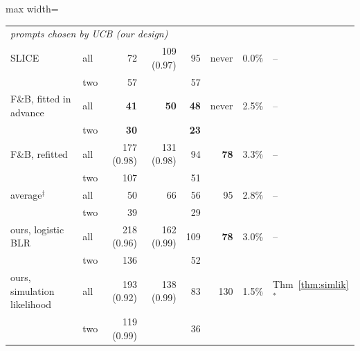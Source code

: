 \documentclass[12pt]{article}
\theoremstyle{remark}
\begin{document}
\begin{table}[t]
\begin{adjustbox}{max width=\textwidth}
\begin{tabular}{llrrrrrl}
\multicolumn{8}{l}{\emph{prompts chosen by UCB (our design)}} \\
SLICE & all & 72 & 109 (0.97) & 95 & never & 0.0\% & -- \\
 & two & 57 &  & 57 &  & & \\
\addlinespace[3pt]
F\&B, fitted in advance & all & \textbf{41} & \textbf{50} & \textbf{48} & never & 2.5\% & -- \\
 & two & \textbf{30} &  & \textbf{23} &  & & \\
\addlinespace[3pt]
F\&B, refitted & all & 177 (0.98) & 131 (0.98) & 94 & \textbf{78} & 3.3\% & -- \\
 & two & 107 &  & 51 &  & & \\
\addlinespace[3pt]
average$^\ddagger$ & all & 50 & 66 & 56 & 95 & 2.8\% & -- \\
 & two & 39 &  & 29 &  & & \\
\addlinespace[3pt]
ours, logistic BLR & all & 218 (0.96) & 162 (0.99) & 109 & \textbf{78} & 3.0\% & -- \\
 & two & 136 &  & 52 &  & & \\
\addlinespace[3pt]
ours, simulation likelihood & all & 193 (0.92) & 138 (0.99) & 83 & 130 & 1.5\% & Thm~\ref{thm:simlik}$^*$ \\
 & two & 119 (0.99) &  & 36 &  & & \\
\bottomrule
\end{tabular}
\end{adjustbox}
\end{table}
\end{document}
